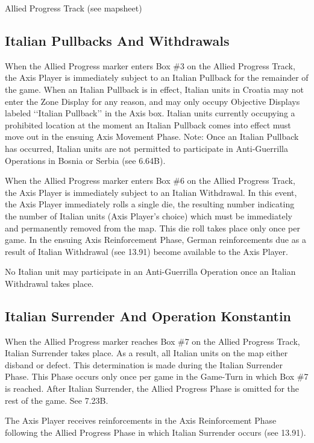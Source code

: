  Allied Progress Track (see mapsheet)

\subsection{Italian Pullbacks And Withdrawals}\label{sec:10.2}

 When the Allied Progress marker enters Box \#3 on the Allied Progress Track, the Axis Player is immediately subject to an Italian Pullback for the remainder of the game. When an Italian Pullback is in effect, Italian units in Croatia may not enter the Zone Display for any reason, and may only occupy Objective Displays labeled ‘‘Italian Pullback’’ in the Axis box. Italian units currently occupying a prohibited location at the moment an Italian Pullback comes into effect must move out in the ensuing Axis Movement Phase. Note: Once an Italian Pullback has occurred, Italian units are not permitted to participate in Anti-Guerrilla Operations in Bosnia or Serbia (see 6.64B).

 When the Allied Progress marker enters Box \#6 on the Allied Progress Track, the Axis Player is immediately subject to an Italian Withdrawal. In this event, the Axis Player immediately rolls a single die, the resulting number indicating the number of Italian units (Axis Player’s choice) which must be immediately and permanently removed from the map. This die roll takes place only once per game. In the ensuing Axis Reinforcement Phase, German reinforcements due as a result of Italian Withdrawal (see 13.91) become available to the Axis Player.

 No Italian unit may participate in an Anti-Guerrilla Operation once an Italian Withdrawal takes place.

\subsection{Italian Surrender And Operation Konstantin}\label{sec:10.3}

When the Allied Progress marker reaches Box \#7 on the Allied Progress Track, Italian Surrender takes place. As a result, all Italian units on the map either disband or defect. This determination is made during the Italian Surrender Phase. This Phase occurs only once per game in the Game-Turn in which Box \#7 is reached. After Italian Surrender, the Allied Progress Phase is omitted for the rest of the game. See 7.23B.

 The Axis Player receives reinforcements in the Axis Reinforcement Phase following the Allied Progress Phase in which Italian Surrender occurs (see 13.91).

